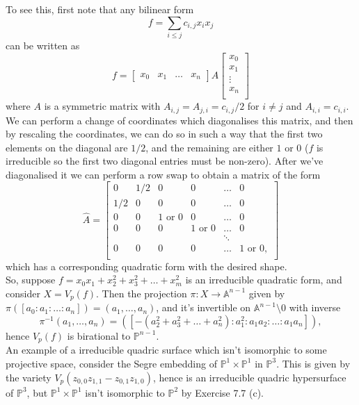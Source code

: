 \documentclass{article}
\theoremstyle{definition}
\renewcommand{\P}{\mathbb{P}}
\newcommand{\A}{\mathbb{A}}
\renewcommand{\AA}[1]{\A^{#1}}
\newcommand{\PP}[1]{\P^{#1}}
\begin{document}
To see this, first note that any bilinear form
\[
	f = \sum_{i \leq j} c_{i, j} x_i x_j
\]
can be written as 
\[
	f 
	=
	\begin{bmatrix}
		x_0 & x_1 & \ldots & x_n 
	\end{bmatrix}
	A
	\begin{bmatrix}
		x_0 \\
		x_1 \\
		\vdots \\
		x_n \\
	\end{bmatrix}
\] 
where $A$ is a symmetric matrix with $A_{i,j} = A_{j, i} = c_{i,j}/2$ for $i
\not = j$ and $A_{i, i} = c_{i, i}$. We can perform a change of coordinates
which diagonalises this matrix, and then by rescaling the coordinates, we can
do so in such a way that the first two elements on the diagonal are $1/2$, and
the remaining are either $1$ or $0$ ($f$ is irreducible so the first two
diagonal entries must be non-zero). After we've diagonalised it we can perform
a row swap to obtain a matrix of the form
\[
	\hat{A}
	=
	\begin{bmatrix}
		0 & 1/2 & 0 & 0 & \ldots & 0 \\
		1/2 & 0 & 0 & 0 &\ldots & 0 \\
		0 & 0 & 1 \text{ or } 0 & 0 & \ldots & 0 \\
		0 & 0 & 0 & 1 \text{ or } 0 & \ldots & 0 \\
		 &  &  &  & \ddots & \\
		0 & 0 & 0 & 0 & \ldots & 1 \text{ or } 0, \\
	\end{bmatrix}
\] 
which has a corresponding quadratic form with the desired shape. \\

So, suppose $f = x_0x_1 + x_2^2 + x_3^2 + \ldots + x_m^2$ is an irreducible
quadratic form, and consider $X = V_p(f)$. Then the projection $\pi : X \to
\AA{n - 1}$ given by $\pi([a_0:a_1:\ldots:a_n]) = (a_1,\ldots,a_n)$, and it's
invertible on $\AA{n - 1} \setminus 0$ with inverse
\[
	\pi^{-1}(a_1, \ldots, a_n) 
	=
	([-(a_2^{2} + a_3^{2} + \ldots + a_n^{2}) : a_1^{2} : a_1a_2 : \ldots : a_1 a_n]),
\]
hence $V_p(f)$ is birational to $\PP{n - 1}$. \\

An example of a irreducible quadric surface which isn't isomorphic to some
projective space, consider the Segre embedding of $\PP{1} \times \PP{1}$ in
$\PP{3}$. This is given by the variety $V_p(z_{0, 0}z_{1,1} - z_{0, 1}z_{1,
0})$, hence is an irreducible quadric hypersurface of $\PP{3}$, but $\PP{1}
\times \PP{1}$ isn't isomorphic to $\PP{2}$ by Exercise 7.7 (c).
\end{document}

